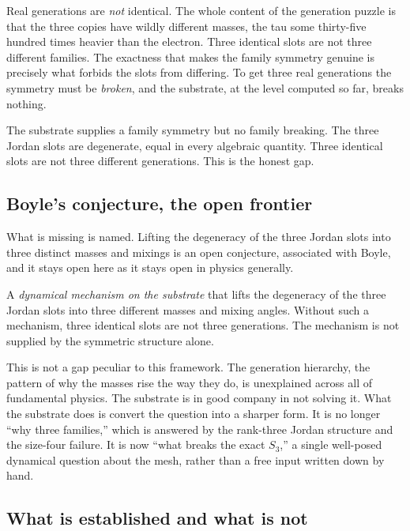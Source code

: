 Real generations are \emph{not} identical. The whole content of the generation puzzle is that the three copies have wildly different masses, the tau some thirty-five hundred times heavier than the electron. Three identical slots are not three different families. The exactness that makes the family symmetry genuine is precisely what forbids the slots from differing. To get three real generations the symmetry must be \emph{broken}, and the substrate, at the level computed so far, breaks nothing.

\begin{result}
The substrate supplies a family symmetry but no family breaking. The three Jordan slots are degenerate, equal in every algebraic quantity. Three identical slots are not three different generations. This is the honest gap.
\end{result}

\subsection{Boyle's conjecture, the open frontier}

What is missing is named. Lifting the degeneracy of the three Jordan slots into three distinct masses and mixings is an open conjecture, associated with Boyle, and it stays open here as it stays open in physics generally.

\begin{principle}
A \emph{dynamical mechanism on the substrate} that lifts the degeneracy of the three Jordan slots into three different masses and mixing angles. Without such a mechanism, three identical slots are not three generations. The mechanism is not supplied by the symmetric structure alone.
\end{principle}

This is not a gap peculiar to this framework. The generation hierarchy, the pattern of why the masses rise the way they do, is unexplained across all of fundamental physics. The substrate is in good company in not solving it. What the substrate does is convert the question into a sharper form. It is no longer ``why three families,'' which is answered by the rank-three Jordan structure and the size-four failure. It is now ``what breaks the exact $S_3$,'' a single well-posed dynamical question about the mesh, rather than a free input written down by hand.

\subsection{What is established and what is not}

